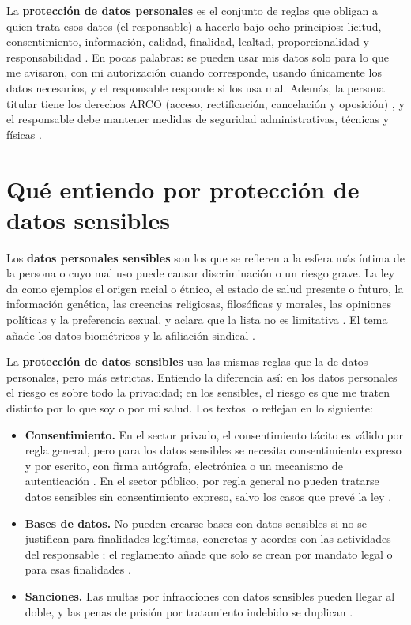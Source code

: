 \documentclass[11pt,letterpaper]{article}
\begin{document}
La \textbf{protección de datos personales} es el conjunto de reglas que obligan a quien trata esos datos (el responsable) a hacerlo bajo ocho principios: licitud, consentimiento, información, calidad, finalidad, lealtad, proporcionalidad y responsabilidad \parencite{iae_u6_t61,lgpdppso2025}. En pocas palabras: se pueden usar mis datos solo para lo que me avisaron, con mi autorización cuando corresponde, usando únicamente los datos necesarios, y el responsable responde si los usa mal. Además, la persona titular tiene los derechos ARCO (acceso, rectificación, cancelación y oposición) \parencite[art.~3, fr.~XI]{lgpdppso2025}, y el responsable debe mantener medidas de seguridad administrativas, técnicas y físicas \parencite[art.~25]{lgpdppso2025}.

\section{Qué entiendo por protección de datos sensibles}

Los \textbf{datos personales sensibles} son los que se refieren a la esfera más íntima de la persona o cuyo mal uso puede causar discriminación o un riesgo grave. La ley da como ejemplos el origen racial o étnico, el estado de salud presente o futuro, la información genética, las creencias religiosas, filosóficas y morales, las opiniones políticas y la preferencia sexual, y aclara que la lista no es limitativa \parencite[art.~3, fr.~X]{lgpdppso2025}. El tema añade los datos biométricos y la afiliación sindical \parencite{iae_u6_t61}.

La \textbf{protección de datos sensibles} usa las mismas reglas que la de datos personales, pero más estrictas. Entiendo la diferencia así: en los datos personales el riesgo es sobre todo la privacidad; en los sensibles, el riesgo es que me traten distinto por lo que soy o por mi salud. Los textos lo reflejan en lo siguiente:

\begin{itemize}
    \item \textbf{Consentimiento.} En el sector privado, el consentimiento tácito es válido por regla general, pero para los datos sensibles se necesita consentimiento expreso y por escrito, con firma autógrafa, electrónica o un mecanismo de autenticación \parencite[arts.~7 y 8]{lfpdppp2025}. En el sector público, por regla general no pueden tratarse datos sensibles sin consentimiento expreso, salvo los casos que prevé la ley \parencite[art.~7]{lgpdppso2025}.
    \item \textbf{Bases de datos.} No pueden crearse bases con datos sensibles si no se justifican para finalidades legítimas, concretas y acordes con las actividades del responsable \parencite[art.~8]{lfpdppp2025}; el reglamento añade que solo se crean por mandato legal o para esas finalidades \parencite[art.~56]{reglamento2011}.
    \item \textbf{Sanciones.} Las multas por infracciones con datos sensibles pueden llegar al doble, y las penas de prisión por tratamiento indebido se duplican \parencite[arts.~59 y 64]{lfpdppp2025}.
\end{itemize}
\end{document}
